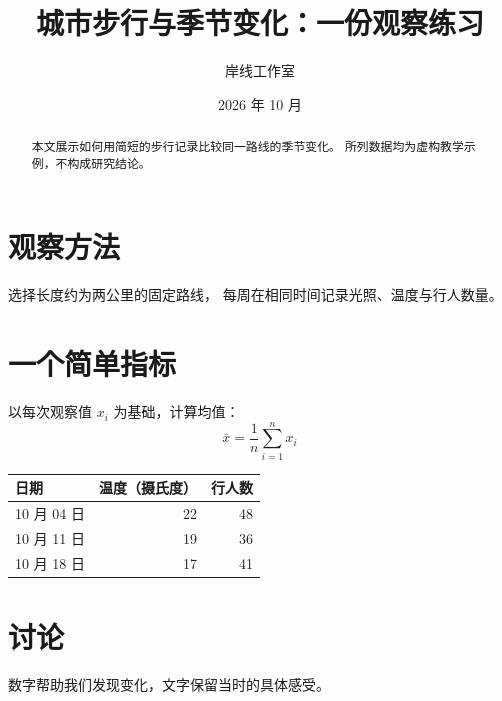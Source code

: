 \documentclass[11pt]{article}
\title{城市步行与季节变化：一份观察练习}
\author{岸线工作室}
\date{2026 年 10 月}
\begin{document}
\maketitle

\begin{abstract}
本文展示如何用简短的步行记录比较同一路线的季节变化。
所列数据均为虚构教学示例，不构成研究结论。
\end{abstract}

\section{观察方法}
选择长度约为两公里的固定路线，
每周在相同时间记录光照、温度与行人数量。

\section{一个简单指标}
以每次观察值 $x_i$ 为基础，计算均值：
\[
  \bar{x} = \frac{1}{n}\sum_{i=1}^{n} x_i
\]

\begin{tabular}{lrr}
\toprule
日期 & 温度（摄氏度） & 行人数 \\
\midrule
10 月 04 日 & 22 & 48 \\
10 月 11 日 & 19 & 36 \\
10 月 18 日 & 17 & 41 \\
\bottomrule
\end{tabular}

\section{讨论}
数字帮助我们发现变化，文字保留当时的具体感受。
\end{document}
